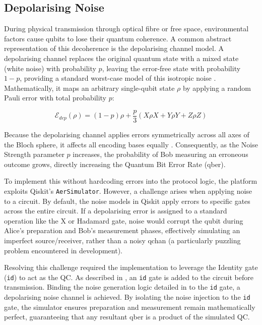 \subsection{Depolarising Noise}
\label{subsec:noise}
During physical transmission through optical fibre or free space, environmental factors cause \glspl{qubit} to lose their quantum coherence. A common abstract representation of this decoherence is the depolarising channel model. A depolarising channel replaces the original quantum state with a mixed state (white noise) with probability $p$, leaving the error-free state with probability $1-p$, providing a standard worst-case model of this isotropic noise \cite{QKDbible}. Mathematically, it maps an arbitrary single-\gls{qubit} state $\rho$ by applying a random Pauli error with total probability $p$:

\begin{equation}
\label{eq:depolarising}
\mathcal{E}_{dep}(\rho) = (1-p)\rho + \frac{p}{3}(X\rho X + Y\rho Y + Z\rho Z)
\end{equation}

Because the depolarising channel applies errors symmetrically across all axes of the Bloch sphere, it affects all encoding bases equally \cite{QKDbible}. Consequently, as the Noise Strength parameter $p$ increases, the probability of Bob measuring an erroneous outcome grows, directly increasing the Quantum Bit Error Rate (\gls{qber}).

To implement this without hardcoding errors into the protocol logic, the platform exploits Qiskit's \texttt{AerSimulator}. However, a challenge arises when applying noise to a circuit. By default, the noise models in Qiskit apply errors to specific gates across the entire circuit. If a depolarising error is assigned to a standard operation like the X or Hadamard gate, noise would corrupt the \gls{qubit} during Alice's preparation and Bob's measurement phases, effectively simulating an imperfect source/receiver, rather than a noisy \gls{qchan} (a particularly puzzling problem encountered in development).

Resolving this challenge required the implementation to leverage the Identity gate (\texttt{id}) to act as the QC. As described in , an \texttt{id} gate is added to the circuit before transmission. Binding the noise generation logic detailed in  to the \texttt{id} gate, a depolarising noise channel is achieved. By isolating the noise injection to the \texttt{id} gate, the simulator ensures preparation and measurement remain mathematically perfect, guaranteeing that any resultant \gls{qber} is a product of the simulated QC.

